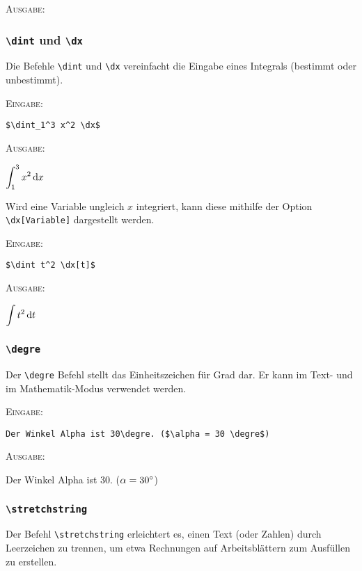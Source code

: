 \documentclass[a4paper,12pt]{article}
\begin{document}
\leer

\textsc{Ausgabe:}



\subsubsection{\texttt{\textbackslash dint} und \texttt{\textbackslash dx}}
Die Befehle \texttt{\textbackslash dint} und \texttt{\textbackslash dx} vereinfacht die Eingabe eines Integrals (bestimmt oder unbestimmt).\leer

\textsc{Eingabe:}

\begin{verbatim}
$\dint_1^3 x^2 \dx$ 
\end{verbatim}

\textsc{Ausgabe:}\leer

$\dint_1^3 x^2 \dx$ 
\leer

Wird eine Variable ungleich $x$ integriert, kann diese mithilfe der Option \texttt{\textbackslash{dx[Variable]}} dargestellt werden.\leer

\textsc{Eingabe:}

\begin{verbatim}
$\dint t^2 \dx[t]$ 
\end{verbatim}

\textsc{Ausgabe:}\leer

$\dint t^2 \dx[t]$

\subsubsection{\texttt{\textbackslash degre}}

Der \texttt{\textbackslash degre} Befehl stellt das Einheitszeichen für Grad dar. Er kann im Text- und im Mathematik-Modus verwendet werden.

\textsc{Eingabe:}

\begin{verbatim}
Der Winkel Alpha ist 30\degre. ($\alpha = 30 \degre$)
\end{verbatim}

\textsc{Ausgabe:}\leer

Der Winkel Alpha ist 30\degre. ($\alpha = 30 \degre$)


\subsubsection{\texttt{\textbackslash stretchstring}}
Der Befehl \texttt{\textbackslash stretchstring} erleichtert es, einen Text (oder Zahlen) durch Leerzeichen zu trennen, um etwa Rechnungen auf Arbeitsblättern zum Ausfüllen zu erstellen.  
\end{document}
